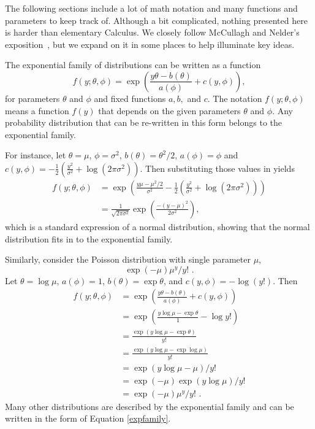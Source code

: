 \documentclass[10pt]{article} %
\begin{document}
The following sections include a lot of math notation and many functions and
parameters to keep track of. Although a bit complicated, nothing presented here
is harder than elementary Calculus. We closely follow McCullagh and Nelder's
exposition~\cite{MN}, but we expand on it in some places to help illuminate key
ideas.

The exponential family of distributions can be written as a function
\begin{equation}\label{expfamily}
f(y; \theta, \phi) = \exp\left(\frac{y\theta - b(\theta)}{a(\phi)} + c(y, \phi)\right),
\end{equation}
for parameters $\theta$ and $\phi$ and fixed functions $a,b,$ and $c$.
The notation $f(y; \theta, \phi)$ means a function $f(y)$ that
depends on the given parameters $\theta$ and $\phi$.
Any probability distribution that can be re-written in this form belongs
to the exponential family.

For instance, let
$\theta=\mu$, $\phi=\sigma^2$, $b(\theta)=\theta^2/2$, $a(\phi)=\phi$
and $c(y, \phi) = -\frac{1}{2}(\frac{y^2}{\sigma^2} + \log(2\pi\sigma^2))$.
Then substituting those values in yields
\begin{align*}
f(y; \theta, \phi) &=
  \exp\left(\frac{y\mu - \mu^2/2}{\sigma^2} - \frac{1}{2}\left(\frac{y^2}{\sigma^2} + \log(2\pi\sigma^2)\right)\right)\\
&= \frac{1}{\sqrt{2\pi\sigma^2}}\exp\left(\frac{-(y - \mu)^2}{2\sigma^2}\right),
\end{align*}
which is a standard expression of a normal distribution,
showing that the normal distribution fits in to the exponential
family.

Similarly, consider the Poisson distribution with single parameter
$\mu$,
\[
\exp(-\mu)\mu^y/{y!}\,\,.
\]
Let $\theta=\log\mu$, $a(\phi)=1$, $b(\theta)=\exp\theta$, and
$c(y, \phi)=-\log{(y!)}$. Then
\begin{align*}
f(y; \theta, \phi) &=  \exp\left(\frac{y\theta - b(\theta)}{a(\phi)} + c(y, \phi)\right)\\
&= \exp\left(\frac{y\log\mu - \exp\theta}{1} - \log y!\right)\\
&= \frac{\exp(y\log\mu - \exp\theta)}{y!}\\
&= \frac{\exp(y\log\mu - \exp\log\mu)}{y!}\\
&= \exp(y\log\mu - \mu)/y!\\
&= \exp{(-\mu)}\exp{(y\log\mu)}/y!\\
&= \exp(-\mu)\mu^y/y!\,\,.
\end{align*}
Many other distributions are described by the exponential family and can be
written in the form of Equation \ref{expfamily}.
\end{document}

